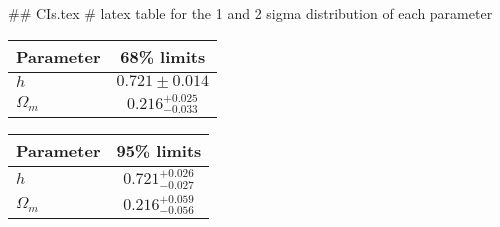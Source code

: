 ## CIs.tex
# latex table for the 1 and 2 sigma distribution of each parameter

\begin{tabular} { l  c}
 Parameter &  68\% limits\\
\hline
{\boldmath$h              $} & $0.721\pm 0.014            $\\
{\boldmath$\Omega_m       $} & $0.216^{+0.025}_{-0.033}   $\\
\hline
\end{tabular}

\begin{tabular} { l  c}
 Parameter &  95\% limits\\
\hline
{\boldmath$h              $} & $0.721^{+0.026}_{-0.027}   $\\
{\boldmath$\Omega_m       $} & $0.216^{+0.059}_{-0.056}   $\\
\hline
\end{tabular}
